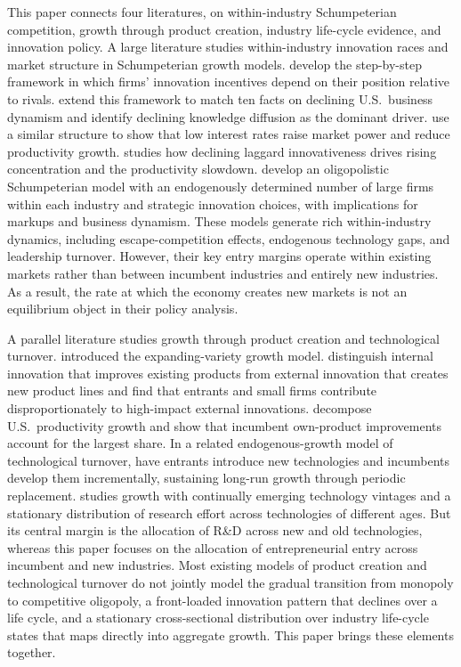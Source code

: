 \documentclass[12pt]{article}
\begin{document}
This paper connects four literatures, on within-industry Schumpeterian competition, growth through product creation, industry life-cycle evidence, and innovation policy. A large literature studies within-industry innovation races and market structure in Schumpeterian growth models. \citet{AghionHHV01} develop the step-by-step framework in which firms' innovation incentives depend on their position relative to rivals. \citet{AkcigitA21,AkcigitA23} extend this framework to match ten facts on declining U.S.\ business dynamism and identify declining knowledge diffusion as the dominant driver. \citet{LiuMS22} use a similar structure to show that low interest rates raise market power and reduce productivity growth. \citet{OlmsteadRumsey22} studies how declining laggard innovativeness drives rising concentration and the productivity slowdown. \citet{CavenaileCT25} develop an oligopolistic Schumpeterian model with an endogenously determined number of large firms within each industry and strategic innovation choices, with implications for markups and business dynamism. These models generate rich within-industry dynamics, including escape-competition effects, endogenous technology gaps, and leadership turnover. However, their key entry margins operate within existing markets rather than between incumbent industries and entirely new industries. As a result, the rate at which the economy creates new markets is not an equilibrium object in their policy analysis.

A parallel literature studies growth through product creation and technological turnover. \citet{Romer90} introduced the expanding-variety growth model. \citet{AkcigitK18} distinguish internal innovation that improves existing products from external innovation that creates new product lines and find that entrants and small firms contribute disproportionately to high-impact external innovations. \citet{GarciaMaciaHK19} decompose U.S.\ productivity growth and show that incumbent own-product improvements account for the largest share. In a related endogenous-growth model of technological turnover, \citet{AghionBBB26} have entrants introduce new technologies and incumbents develop them incrementally, sustaining long-run growth through periodic replacement. \citet{Ribeiro26} studies growth with continually emerging technology vintages and a stationary distribution of research effort across technologies of different ages. But its central margin is the allocation of R\&D across new and old technologies, whereas this paper focuses on the allocation of entrepreneurial entry across incumbent and new industries. Most existing models of product creation and technological turnover do not jointly model the gradual transition from monopoly to competitive oligopoly, a front-loaded innovation pattern that declines over a life cycle, and a stationary cross-sectional distribution over industry life-cycle states that maps directly into aggregate growth. This paper brings these elements together.
\end{document}
